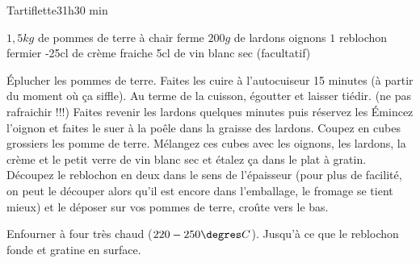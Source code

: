 \begin{recette}{Tartiflette}{3}{1h}{30 min}

\begin{ingredients}
\ingredient $1,5\unit{kg}$ de pommes de terre à chair ferme
\ingredient $200\unit{g}$ de lardons
 oignons
\ingredient $1$ reblochon fermier
-25cl de crème fraiche
\ingredient 5cl de vin blanc sec (facultatif)
\end{ingredients}

\begin{preparation}
\etape Éplucher les pommes de terre. Faites les cuire à l'autocuiseur 15 minutes (à partir du moment où ça siffle).
\etape Au terme de la cuisson, égoutter et laisser tiédir. (ne pas rafraichir !!!)
\etape Faites revenir les lardons quelques minutes puis réservez les
\etape Émincez l'oignon et faites le suer à la poêle dans la graisse des lardons.
\etape Coupez en cubes grossiers les pomme de terre. Mélangez ces cubes avec les oignons, les lardons, la crème et le petit verre de vin blanc sec et étalez ça dans le plat à gratin. 
\etape Découpez le reblochon en deux dans le sens de l'épaisseur (pour plus de facilité, on peut le découper alors qu'il est encore dans l'emballage, le fromage se tient mieux) et le déposer sur vos pommes de terre, croûte vers le bas.
\end{preparation}

\begin{cuisson}
Enfourner à four très chaud ($220-250\degres C$). Jusqu'à ce que le reblochon fonde et gratine en surface.
\end{cuisson}
\end{recette}

